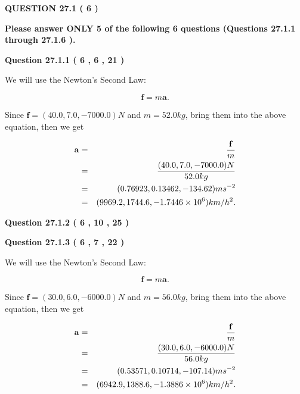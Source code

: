 \documentclass[12pt]{article}
\begin{document}
{\textbf{\Large{QUESTION
27.1 
 (           6 )
}}}
  
  
{\textbf{\Large{Please answer ONLY  %
           5  %
 of the following  %
           6  %
 questions (Questions  %
27.1.1 %
 through  %
27.1.6 %
 ). }}}
   
   
  
\vspace{0.2in}
  
{\textbf{\Large{Question
27.1.1 
 (           6 ,           6 ,          21 )
}}}
  
  
 
 

We will use the Newton's Second Law:
 
\[
\mathbf{f}=m\mathbf{a}.
\]
 
Since $\mathbf{f}=( %
40.0,  %
7.0,  %
-7000.0 )N$
and $m= %
52.0 kg$, bring them into the above equation, then we get
 
\begin{eqnarray*}
\mathbf{a}&=&\frac{\mathbf{f}}m  \\
&=&\frac{(
40.0 ,
7.0 ,
-7000.0 )N
}{ %
52.0 kg}  \\
&=&(
0.76923 ,
0.13462,
-134.62
)ms^{-2} \\
&=&(
9969.2 ,
1744.6 ,
-1.7446 \times 10^{6}
)km/h^2.
\end{eqnarray*}
 
 
 
  
\vspace{0.2in}
  
{\textbf{\Large{Question
27.1.2 
 (           6 ,          10 ,          25 )
}}}
  
  
  
\vspace{0.2in}
  
{\textbf{\Large{Question
27.1.3 
 (           6 ,           7 ,          22 )
}}}
  
  
 
 

We will use the Newton's Second Law:
 
\[
\mathbf{f}=m\mathbf{a}.
\]
 
Since $\mathbf{f}=( %
30.0,  %
6.0,  %
-6000.0 )N$
and $m= %
56.0 kg$, bring them into the above equation, then we get
 
\begin{eqnarray*}
\mathbf{a}&=&\frac{\mathbf{f}}m  \\
&=&\frac{(
30.0 ,
6.0 ,
-6000.0 )N
}{ %
56.0 kg}  \\
&=&(
0.53571 ,
0.10714,
-107.14
)ms^{-2} \\
&=&(
6942.9 ,
1388.6 ,
-1.3886 \times 10^{6}
)km/h^2.
\end{eqnarray*}
 
\end{document}
